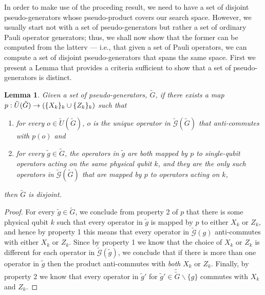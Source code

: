 \documentclass[twocolumn,showpacs,preprintnumbers,amsmath,amssymb,nofootinbib,pra,floatfix]{revtex4-1}
\newtheorem{lemma}{Lemma}
\newenvironment{remark}[1][Remark]{\begin{trivlist}
\item[\hskip \labelsep {\bfseries #1}]}{\end{trivlist}}
\newcommand{\set}{\tilde}
\newcommand{\genfun}{\tilde{\mathcal{G}}}
\begin{document}
\begin{remark}
In order to make use of the proceding result, we need to have a set of disjoint pseudo-generators whose pseudo-product covers our search space.  However, we usually start not with a set of pseudo-generators but rather a set of ordinary Pauli operator generators;  thus, we shall now show that the former can be computed from the latterv --- i.e., that given a set of Pauli operators, we can compute a set of disjoint pseudo-generators that spans the same space.  First we present a Lemma that provides a criteria sufficient to show that a set of pseudo-generators is distinct.
\end{remark}

\begin{lemma}
\label{lemma:disjointness-equvalence}
Given a set of pseudo-generators, $\set G$, if there exists a map $p:\set U(\set G)\to \paren{\{X_k\}_k \cup \{Z_k\}_k}$ such that
\begin{enumerate}
\item for every $o\in\set U(\set G)$, $o$ is the unique operator in $\genfun(\set G)$ that anti-commutes with $p(o)$ and
\item for every $\set g\in\set G$, the operators in $\set g$ are both mapped by $p$ to single-qubit operators acting on the same physical qubit $k$, and they are the only such operators in $\genfun(\set G)$ that are mapped by $p$ to operators acting on $k$,
\end{enumerate}
then $\set G$ is disjoint.
\end{lemma}

\begin{proof}
For every $\set g\in\set G$, we conclude from property 2 of $p$ that there is some physical qubit $k$ such that every operator in $\set g$ is mapped by $p$ to either $X_k$ or $Z_k$, and hence by property 1 this means that every operator in $\genfun(g)$ anti-commutes with either $X_k$ or $Z_k$.  Since by property 1 we know that the choice of $X_k$ or $Z_k$ is different for each operator in $\genfun(\set g)$, we conclude that if there is more than one operator in $\set g$ then the product anti-commutes with \emph{both} $X_k$ or $Z_k$.  Finally, by property 2 we know that every operator in $\set g'$ for $\set g'\in\set \set G\backslash\{g\}$ commutes with $X_k$ and $Z_k$.
\end{proof}
\end{document}
